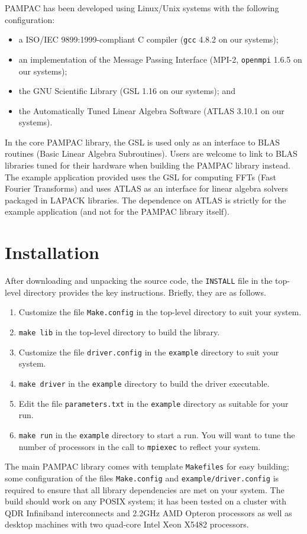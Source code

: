 \documentclass{article}
\newcommand{\pampac}{\textsc{PAMPAC}\xspace}
\begin{document}
\pampac has been developed using Linux/Unix systems with the following configuration:
\begin{itemize}
\item a ISO/IEC 9899:1999-compliant C compiler (\texttt{gcc} 4.8.2 on our systems);
\item an implementation of the Message Passing Interface (MPI-2, \texttt{openmpi} 1.6.5 on our systems);
\item the GNU Scientific Library (GSL 1.16 on our systems); and
\item the Automatically Tuned Linear Algebra Software (ATLAS 3.10.1 on our systems). 
\end{itemize}
%
In the core \pampac library, the GSL is used only as an interface to BLAS routines (Basic Linear Algebra
Subroutines). Users are welcome to link to BLAS libraries tuned for their hardware when building the \pampac
library instead.
The example application provided uses the GSL for computing FFTs (Fast Fourier Transforms) and uses ATLAS
as an interface for linear algebra solvers packaged in LAPACK libraries.
The dependence on ATLAS is strictly for the example application (and not for the \pampac library itself).

\section{Installation}

After downloading and unpacking the source code, the \texttt{INSTALL} file in the top-level
directory provides the key instructions. Briefly, they are as follows.

\begin{enumerate}
\item Customize the file \texttt{Make.config} in the top-level directory to suit your system.
\item \texttt{make lib} in the top-level directory to build the library.
\item Customize the file \texttt{driver.config} in the \texttt{example} directory to suit your system.
\item \texttt{make driver} in the \texttt{example} directory to build the driver executable.
\item Edit the file \texttt{parameters.txt} in the \texttt{example} directory as suitable for your run.
\item \texttt{make run} in the \texttt{example} directory to start a run. You will want to tune the number of
processors in the call to \texttt{mpiexec} to reflect your system.
\end{enumerate}
%
The main \pampac library comes with template \texttt{Makefiles} for easy building;
some configuration of the files \texttt{Make.config} and \texttt{example/driver.config} is
required to ensure that all library dependencies are met on your system.
%
The build should work on any POSIX system; it has been tested on a cluster with QDR Infiniband interconnects and
2.2GHz AMD Opteron processors as well as desktop machines with two quad-core Intel Xeon X5482 processors.
\end{document}
